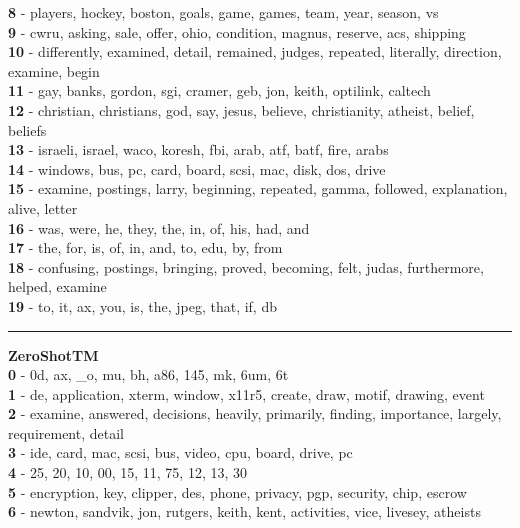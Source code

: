 \textbf{8} - players, hockey, boston, goals, game, games, team, year, season, vs\\
\textbf{9} - cwru, asking, sale, offer, ohio, condition, magnus, reserve, acs, shipping\\
\textbf{10} - differently, examined, detail, remained, judges, repeated, literally, direction, examine, begin\\
\textbf{11} - gay, banks, gordon, sgi, cramer, geb, jon, keith, optilink, caltech\\
\textbf{12} - christian, christians, god, say, jesus, believe, christianity, atheist, belief, beliefs\\
\textbf{13} - israeli, israel, waco, koresh, fbi, arab, atf, batf, fire, arabs\\
\textbf{14} - windows, bus, pc, card, board, scsi, mac, disk, dos, drive\\
\textbf{15} - examine, postings, larry, beginning, repeated, gamma, followed, explanation, alive, letter\\
\textbf{16} - was, were, he, they, the, in, of, his, had, and\\
\textbf{17} - the, for, is, of, in, and, to, edu, by, from\\
\textbf{18} - confusing, postings, bringing, proved, becoming, felt, judas, furthermore, helped, examine\\
\textbf{19} - to, it, ax, you, is, the, jpeg, that, if, db\\
\hrule\vspace{2mm}
\noindent
\textbf{ZeroShotTM}\vspace{2mm}\\
\vspace{2mm}
\noindent
\textbf{0} - 0d, ax, \_o, mu, bh, a86, 145, mk, 6um, 6t\\
\textbf{1} - de, application, xterm, window, x11r5, create, draw, motif, drawing, event\\
\textbf{2} - examine, answered, decisions, heavily, primarily, finding, importance, largely, requirement, detail\\
\textbf{3} - ide, card, mac, scsi, bus, video, cpu, board, drive, pc\\
\textbf{4} - 25, 20, 10, 00, 15, 11, 75, 12, 13, 30\\
\textbf{5} - encryption, key, clipper, des, phone, privacy, pgp, security, chip, escrow\\
\textbf{6} - newton, sandvik, jon, rutgers, keith, kent, activities, vice, livesey, atheists\\
